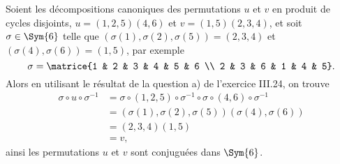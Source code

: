 Soient les décompositions canoniques des permutations $u$ et $v$ en produit de cycles disjoints, $u = (1,2,5)(4,6)$ et $v = (1,5)(2,3,4)$, et soit $\sigma\in\Sym{6}$ telle que $(\sigma(1),\sigma(2),\sigma(5)) = (2,3,4)$ et $(\sigma(4),\sigma(6)) = (1,5)$, par exemple
\[
  \sigma = \matrice{1 & 2 & 3 & 4 & 5 & 6 \\ 2 & 3 & 6 & 1 & 4 & 5}.
\]
Alors en utilisant le résultat de la question a) de l'exercice III.24, on trouve
%
\begin{align*}
    \sigma\circ u\circ\sigma^{-1} 
        &= \sigma\circ (1,2,5)\circ\sigma^{-1}\circ\sigma\circ (4,6)\circ\sigma^{-1} \\
        &= (\sigma(1),\sigma(2),\sigma(5))(\sigma(4),\sigma(6)) \\
        &= (2,3,4) (1,5) \\
        &= v,
\end{align*}
%
ainsi les permutations $u$ et $v$ sont conjuguées dans $\Sym{6}$.
